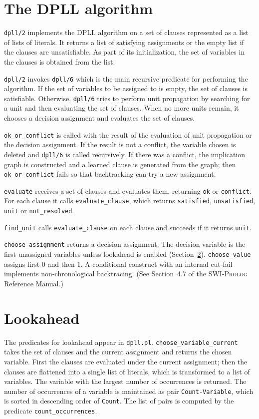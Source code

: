 \documentclass[11pt]{article}
\newcommand*{\p}[1]{\textup{\texttt{#1}}}
\newcommand*{\sw}{\textsc{SWI-Prolog}}
\begin{document}
\section{The DPLL algorithm}

\p{dpll/2} implements the DPLL algorithm on a set of
clauses represented as a list of lists of literals. It returns a list of
satisfying assignments or the empty list if the clauses are
unsatisfiable. As part of its initialization, the set of variables in
the clauses is obtained from the list.

\p{dpll/2} invokes \p{dpll/6} which is the main recursive
predicate for performing the algorithm. If the set of variables to be
assigned to is empty, the set of clauses is satisfiable. Otherwise,
\p{dpll/6} tries to perform unit propagation by searching for a unit and
then evaluating the set of clauses. When no more units remain, it
chooses a decision assignment and evaluates the set of clauses.

\p{ok\_or\_conflict} is called with the result of the
evaluation of unit propagation or the decision assignment. If the
result is not a conflict, the variable chosen is deleted and \p{dpll/6}
is called recursively. If there was a conflict, the implication graph is
constructed and a learned clause is generated from the graph; then
\p{ok\_or\_conflict} fails so that backtracking can try a new
assignment.

\p{evaluate} receives a set of clauses and evaluates them,
returning \p{ok} or \p{conflict}. For each clause it calls
\p{evaluate\_clause}, which returns \p{satisfied}, \p{unsatisfied},
\p{unit} or \p{not\_resolved}.

\p{find\_unit} calls \p{evaluate\_clause} on each clause and succeeds if it returns \p{unit}.

\p{choose\_assignment} returns a decision assignment. The decision variable is the first unassigned variables unless lookahead is enabled (Section~\ref{s.look}). \p{choose\_value} assigns first 0 and then 1. A conditional construct with an internal cut-fail implements non-chronological backtracing. (See Section~4.7 of the \sw{} Reference Manual.)

\section{Lookahead}\label{s.look}

The predicates for lookahead appear in \p{dpll.pl}. \p{choose\_variable\_current} takes the set of clauses and the current assignment and returns the chosen variable. First the clauses are evaluated under the current assignment; then the clauses are flattened into a single list of literals, which is transformed to a list of variables. The variable with the largest number of occurrences is returned. The number of occurrences of a variable is maintained as pair \p{Count-Variable}, which is sorted in descending order of \p{Count}. The list of pairs is computed by the predicate \p{count\_occurrences}.
\end{document}
